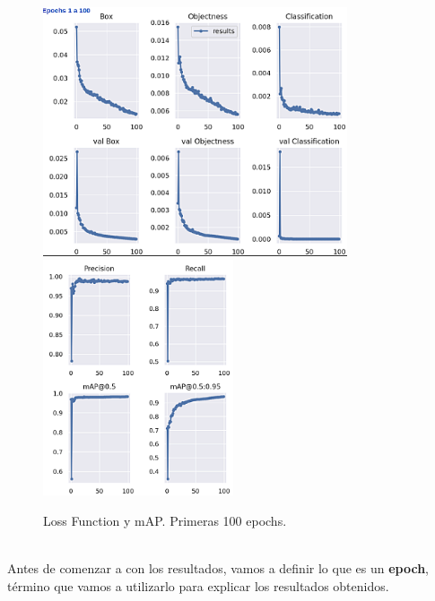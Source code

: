 \begin{figure}
    \centering
    \includegraphics[width=0.8\textwidth]{img/resultados_finales_100_part1_sharped.png}
    \includegraphics[width=0.5\textwidth]{img/resultados_finales_100_part2_sharped.png}
    \caption{Loss Function y mAP. Primeras 100 epochs.}
    \label{fig:loss-functions-map-100}
\end{figure}\\

Antes de comenzar a con los resultados, vamos a definir lo que es un \textbf{epoch}, término que vamos a utilizarlo para explicar los resultados obtenidos.\\

